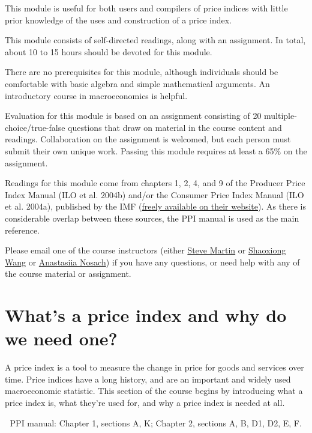 \documentclass[
]{article}
\begin{document}
This module is useful for both users and compilers of price indices with little prior knowledge of the uses and construction of a price index.

This module consists of self-directed readings, along with an assignment. In total, about 10 to 15 hours should be devoted for this module.

There are no prerequisites for this module, although individuals should be comfortable with basic algebra and simple mathematical arguments. An introductory course in macroeconomics is helpful.

Evaluation for this module is based on an assignment consisting of 20 multiple-choice/true-false questions that draw on material in the course content and readings. Collaboration on the assignment is welcomed, but each person must submit their own unique work. Passing this module requires at least a 65\% on the assignment.

Readings for this module come from chapters 1, 2, 4, and 9 of the Producer Price Index Manual (ILO et al. 2004b) and/or the Consumer Price Index Manual (ILO et al. 2004a), published by the IMF (\href{https://www.imf.org/en/Publications/Manuals-Guides/Issues/2016/12/30/Producer-Price-Index-Manual-Theory-and-Practice-16966}{freely available on their website}). As there is considerable overlap between these sources, the PPI manual is used as the main reference.

Please email one of the course instructors (either \href{mailto:steve.martin5@canada.ca}{Steve Martin} or \href{mailto:shaoxiong.wang@canada.ca}{Shaoxiong Wang} or \href{mailto:anastasiia.nosach@canada.ca}{Anastasiia Nosach}) if you have any questions, or need help with any of the course material or assignment.

\hypertarget{whats-a-price-index-and-why-do-we-need-one}{%
\section{What's a price index and why do we need one?}\label{whats-a-price-index-and-why-do-we-need-one}}

A price index is a tool to measure the change in price for goods and services over time. Price indices have a long history, and are an important and widely used macroeconomic statistic. This section of the course begins by introducing what a price index is, what they're used for, and why a price index is needed at all.

📖 PPI manual: Chapter 1, sections A, K; Chapter 2, sections A, B, D1, D2, E, F.
\end{document}
